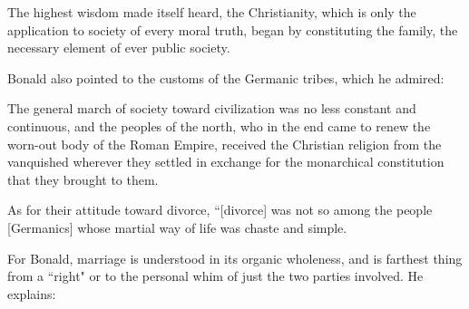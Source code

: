\begin{quotex}
The highest wisdom made itself heard, the Christianity, which is only the application to society of every moral truth, began by constituting the family, the necessary element of ever public society. 

\end{quotex}
Bonald also pointed to the customs of the Germanic tribes, which he admired:

\begin{quotex}
The general march of society toward civilization was no less constant and continuous, and the peoples of the north, who in the end came to renew the worn-out body of the Roman Empire, received the Christian religion from the vanquished wherever they settled in exchange for the monarchical constitution that they brought to them. 

\end{quotex}
As for their attitude toward divorce, ``[divorce] was not so among the people [Germanics] whose martial way of life was chaste and simple.

For Bonald, marriage is understood in its organic wholeness, and is farthest thing from a ``right" or to the personal whim of just the two parties involved. He explains:

